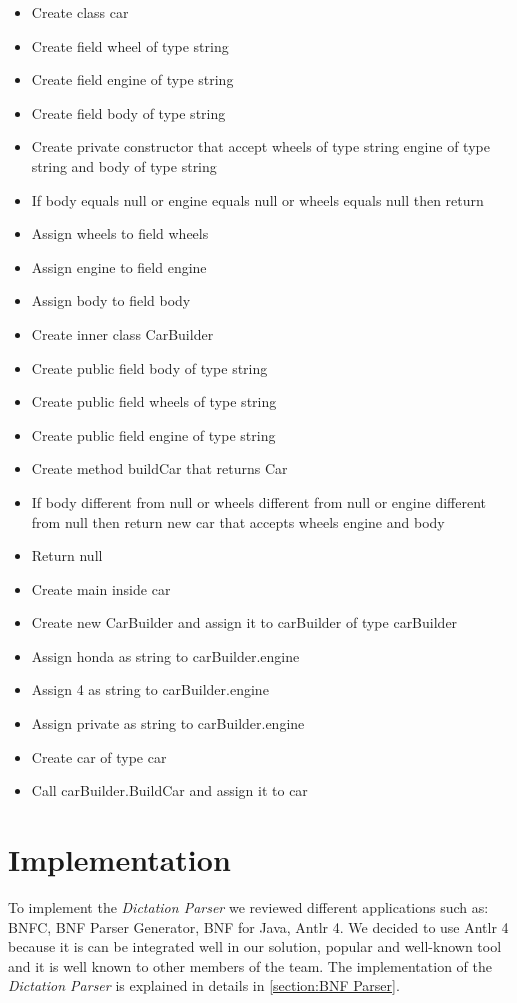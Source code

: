 \begin{itemize} \label{itemize:Car Builder Dictation}
	\item Create class car
	\item Create field wheel of type string
	\item Create field engine of type string
	\item Create field body of type string
	\item Create private constructor that accept wheels of type string engine of type string and body of type string
	\item If body equals null or engine equals null or wheels equals null then return	
	\item Assign wheels to field wheels
	\item Assign engine to field engine
	\item Assign body to field body
	\item Create inner class CarBuilder
	\item Create public field body of type string
	\item Create public field wheels of type string
	\item Create public field engine of type string
	\item Create method buildCar that returns Car
	\item If body different from null or wheels different from null or engine different from null then return new car that accepts wheels engine and body
	\item Return null
	\item Create main inside car
	\item Create new CarBuilder and assign it to carBuilder of type carBuilder
	\item Assign honda as string to carBuilder.engine
	\item Assign 4 as string to carBuilder.engine
	\item Assign private as string to carBuilder.engine
	\item Create car of type car
	\item Call carBuilder.BuildCar and assign it to car
\end{itemize}
\section{Implementation}
To implement the \textit{Dictation Parser} we reviewed different applications such as: BNFC, BNF Parser Generator, BNF for Java, Antlr 4. We decided to use Antlr 4 because it is can be integrated well in our solution, popular and well-known tool and it is well known to other members of the team. The implementation of the \textit{Dictation Parser} is explained in details in \ref{section:BNF Parser}.
